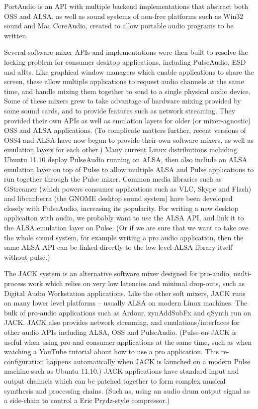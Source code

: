 \documentclass[oneside,english]{scrbook}
\begin{document}
PortAudio is an API with multiple backend implementations that abstract both OSS and ALSA, as well as sound systems of non-free platforms such as Win32 sound and Mac CoreAudio, created to allow portable audio programs to be written.  

Several software mixer APIs and implementations were then built to resolve the locking problem for consumer desktop applications, including PulseAudio, ESD and aRts.  Like graphical window managers which enable applications to share the screen, these allow multiple applications to request audio channels at the same time, and handle mixing them together to send to a single physical audio device.  Some of these mixers grew to take advantage of hardware mixing provided by some sound cards, and to provide features such as network streaming.  They provided their own APIs as well as emulation layers for older (or mixer-agnostic) OSS and ALSA applications.  (To complicate matters further, recent versions of OSS4 and ALSA have now begun to provide their own software mixers, as well as emulation layers for each other.)  Many current Linux distributions including Ubuntu 11.10 deploy PulseAudio running on ALSA, then also include an ALSA emulation layer on top of Pulse to allow multiple ALSA and Pulse applications to run together through the Pulse mixer.  Common media libraries such as GStreamer (which powers consumer applications such as VLC, Skype and Flash) and libcanberra (the GNOME desktop sound system) have been developed closely with PulseAudio, increasing its popularity.  For writing a new desktop applicaiton with audio, we probably want to use the ALSA API, and link it to the ALSA emulation layer on Pulse.  (Or if we are sure that we want to take ove the whole sound system, for example writing a pro audio application, then the same ALSA API can be linked directly to the low-level ALSA library itself without pulse.)

The JACK system is an alternative software mixer designed for pro-audio, multi-process work which relies on very low latencies and minimal drop-outs, such as Digital Audio Workstation applications.  Like the other soft mixers, JACK runs on many lower level platforms -- usually ALSA on modern Linux machines.  The bulk of pro-audio applications such as Ardour, zynAddSubFx and qSynth run on JACK.  JACK also provides network streaming, and emulations/interfaces for other audio APIs including ALSA, OSS and PulseAudio.  (Pulse-on-JACK is useful when using pro and consumer applications at the same time, such as when watching a YouTube tutorial about how to use a pro application.  This re-configuration happens automatically when JACK is launched on a modern Pulse machine such as Ubuntu 11.10.)  JACK applications have standard input and output channels which can be patched together to form complex musical symthesis and processing chains. (Such as, using an audio drum output signal as a side-chain to control a Eric Prydz-style compressor.)
\end{document}
